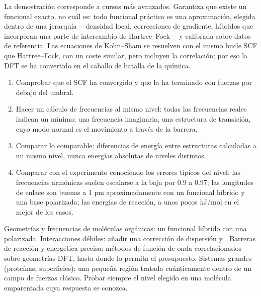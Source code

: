 La demostración corresponde a cursos más avanzados. Garantiza que existe un funcional
exacto, no cuál es: todo funcional práctico es una
aproximación, elegida dentro de una jerarquía ---densidad local, correcciones de
gradiente, híbridos que incorporan una parte de intercambio de Hartree--Fock--- y
calibrada sobre datos de referencia. Las ecuaciones de Kohn--Sham se resuelven con el
mismo bucle SCF que Hartree--Fock, con un coste similar, pero incluyen la correlación;
por eso la DFT se ha convertido en el caballo de batalla de la química.

\begin{method}\label{met:b3:computational-chemistry:read-calculation}
\begin{enumerate}
  \item Comprobar que el SCF ha convergido y que la  ha terminado
        con fuerzas por debajo del umbral.
  \item Hacer un cálculo de frecuencias al mismo nivel: todas las frecuencias reales
        indican un mínimo; una frecuencia imaginaria, una estructura de transición, cuyo
        modo normal es el movimiento a través de la barrera.
  \item Comparar lo comparable: diferencias de energía entre estructuras
        calculadas a un mismo nivel, nunca energías absolutas de niveles distintos.
  \item Comparar con el experimento conociendo los errores típicos del nivel:
        las frecuencias armónicas suelen escalarse a la baja por 0.9 a 0.97;
        las longitudes de enlace son buenas a 1 pm aproximadamente con un funcional híbrido y una
        base polarizada; las energías de reacción, a unos pocos \unit{kJ/mol} en el mejor de los casos.
\end{enumerate}
\end{method}

\begin{method}\label{met:b3:computational-chemistry:choose-level}
Geometrías y frecuencias de moléculas orgánicas: un funcional híbrido con una
 polarizada. Interacciones débiles: añadir una corrección de
dispersión y . Barreras de reacción y energética
precisa: métodos de función de onda correlacionados sobre geometrías DFT, hasta donde lo
permita el presupuesto. Sistemas grandes (proteínas, superficies): una pequeña región tratada
cuánticamente dentro de un campo de fuerzas clásico. Probar siempre el nivel
elegido en una molécula emparentada cuya respuesta se conozca.
\end{method}

